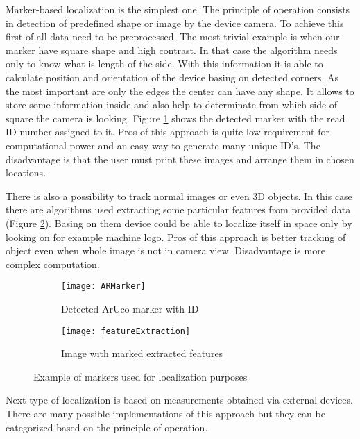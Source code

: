 \documentclass[printmode,en]{mgr}
\begin{document}
Marker-based localization is the simplest one. The principle of operation consists in detection of predefined shape or image by the device camera. To achieve this first of all data need to be preprocessed. The most trivial example is when our marker have square shape and high contrast. In that case the algorithm needs only to know what is length of the side. With this information it is able to calculate position and orientation of the device basing on detected corners. As the most important are only the edges the center can have any shape. It allows to store some information inside and also help to determinate from which side of square the camera is looking. Figure \ref{fig:ARMarker} shows the detected marker with the read ID number assigned to it. Pros of this approach is quite low requirement for computational power and an easy way to generate many unique ID's. The disadvantage is that the user must print these images and arrange them in chosen locations.

There is also a possibility to track normal images or even 3D objects. In this case there are algorithms used extracting some particular features from provided data (Figure \ref{fig:featureExtraction}). Basing on them device could be able to localize itself in space only by looking on for example machine logo. Pros of this approach is better tracking of object even when whole image is not in camera view. Disadvantage is more complex computation.

\begin{figure}[!ht]
\centering
\begin{subfigure}{.5\textwidth}
  \centering
  \texttt{[image: ARMarker]}
  \caption{Detected ArUco marker with ID \cite{ArUco}}
  \label{fig:ARMarker}
\end{subfigure}%
\begin{subfigure}{.5\textwidth}
  \centering
  \texttt{[image: featureExtraction]}
  \caption{Image with marked extracted features}
  \label{fig:featureExtraction}
\end{subfigure}
\caption{Example of markers used for localization purposes}
\label{fig:markerBasedLocalization}
\end{figure}

Next type of localization is based on measurements obtained via external devices. There are many possible implementations of this approach but they can be categorized based on the principle of operation.
\end{document}

